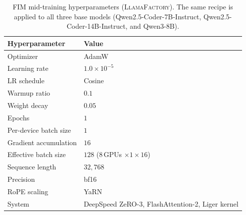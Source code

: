 \begin{table}[h]
\centering
\footnotesize
\caption{FIM mid-training hyperparameters (\textsc{LlamaFactory}). The
same recipe is applied to all three base models
(Qwen2.5-Coder-7B-Instruct, Qwen2.5-Coder-14B-Instruct, and
Qwen3-8B).}
\label{tab:hp-midtrain}
\begin{tabular}{ll}
\toprule
\textbf{Hyperparameter} & \textbf{Value} \\
\midrule
Optimizer            & AdamW \\
Learning rate        & $1.0\!\times\!10^{-5}$ \\
LR schedule          & Cosine \\
Warmup ratio         & $0.1$ \\
Weight decay         & $0.05$ \\
Epochs               & $1$ \\
Per-device batch size & $1$ \\
Gradient accumulation & $16$ \\
Effective batch size & $128$ (8\,GPUs $\times 1 \times 16$) \\
Sequence length      & $32{,}768$ \\
Precision            & bf16 \\
RoPE scaling         & YaRN \\
System               & DeepSpeed ZeRO-3, FlashAttention-2, Liger kernel \\
\bottomrule
\end{tabular}
\end{table}

